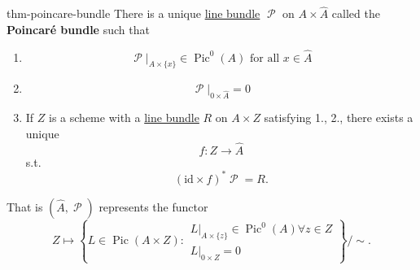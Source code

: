 \documentclass[10pt,]{book}
\newcommand{\terminology}[1]{\textbf{#1}}
\numberwithin{equation}{section}
\newcommand{\sheaf}[1]{\operatorname{\mathcal{#1}}}
\newcommand{\id}{\mathrm{id}}
\DeclareMathOperator{\Pic}{Pic}
\begin{document}
\begin{theorem}{}{}{thm-poincare-bundle}%
\hypertarget{p-194}{}%
There is a unique \hyperref[def-line-bundle]{line bundle} \(\sheaf P\) on \(A\times \hat A\) called the \terminology{Poincaré bundle} such that\leavevmode%
\begin{enumerate}
\item\hypertarget{li-35}{}%
\begin{equation*}
\sheaf P|_{A\times \{x\}} \in \Pic^0(A) \text{ for all }x\in \hat A
\end{equation*}
%
\item\hypertarget{li-36}{}%
\begin{equation*}
\sheaf P|_{0\times \hat A} = 0
\end{equation*}
%
\item\hypertarget{li-37}{}If \(Z\) is a  scheme with a \hyperref[def-line-bundle]{line bundle} \(R\) on \(A\times Z\) satisfying 1., 2., there exists a unique%
\begin{equation*}
f\colon Z\to \hat A
\end{equation*}
s.t.%
\begin{equation*}
(\id\times f)^* \sheaf P = R\text{.}
\end{equation*}
%
\end{enumerate}
That is \((\hat A, \sheaf P)\)  represents the functor%
\begin{equation*}
Z \mapsto \left\{ L\in \Pic (A\times Z) : \substack{ L|_{A\times \{z\}} \in \Pic^0(A) \forall z\in Z \\L|_{ 0 \times Z } = 0}\right\}/\sim\text{.}
\end{equation*}
%
\end{theorem}
%
%
\typeout{************************************************}
\typeout{************************************************}
%
\end{document}
